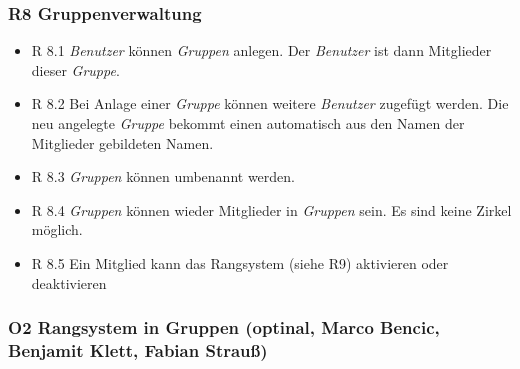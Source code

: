 \documentclass{article}
\begin{document}
\subsubsection{R8 Gruppenverwaltung}
    \begin{itemize}
        \item{R 8.1} \textit{Benutzer} können \textit{Gruppen} anlegen. Der \textit{Benutzer} ist dann Mitglieder dieser \textit{Gruppe}.
        \item{R 8.2} Bei Anlage einer \textit{Gruppe} können weitere \textit{Benutzer} zugefügt werden. Die neu angelegte \textit{Gruppe} bekommt einen automatisch aus den Namen der Mitglieder gebildeten Namen. 
        \item{R 8.3} \textit{Gruppen} können umbenannt werden. 
        \item{R 8.4} \textit{Gruppen} können wieder Mitglieder in \textit{Gruppen} sein. Es sind keine Zirkel möglich. 
        \item{R 8.5} Ein Mitglied kann das Rangsystem (siehe R9) aktivieren oder deaktivieren
    \end{itemize}
    

       
\subsubsection{O2 Rangsystem in Gruppen (optinal, Marco Bencic, Benjamit Klett, Fabian Strauß)}
\end{document}
